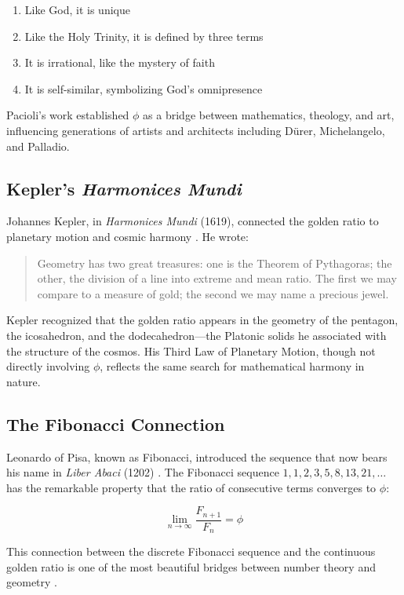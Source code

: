 \begin{enumerate}
    \item Like God, it is unique
    \item Like the Holy Trinity, it is defined by three terms
    \item It is irrational, like the mystery of faith
    \item It is self-similar, symbolizing God's omnipresence
\end{enumerate}

Pacioli's work established $\phi$ as a bridge between mathematics, theology, and art, influencing generations of artists and architects including Dürer, Michelangelo, and Palladio.

\subsection{Kepler's \emph{Harmonices Mundi}}

Johannes Kepler, in \emph{Harmonices Mundi} (1619), connected the golden ratio to planetary motion and cosmic harmony \cite{kepler_harmonices}. He wrote:

\begin{quote}
Geometry has two great treasures: one is the Theorem of Pythagoras; the other, the division of a line into extreme and mean ratio. The first we may compare to a measure of gold; the second we may name a precious jewel.
\end{quote}

Kepler recognized that the golden ratio appears in the geometry of the pentagon, the icosahedron, and the dodecahedron—the Platonic solids he associated with the structure of the cosmos. His Third Law of Planetary Motion, though not directly involving $\phi$, reflects the same search for mathematical harmony in nature.

\subsection{The Fibonacci Connection}

Leonardo of Pisa, known as Fibonacci, introduced the sequence that now bears his name in \emph{Liber Abaci} (1202) \cite{fibonacci_liber_abaci}. The Fibonacci sequence $1, 1, 2, 3, 5, 8, 13, 21, \dots$ has the remarkable property that the ratio of consecutive terms converges to $\phi$:

\[
\lim_{n \to \infty} \frac{F_{n+1}}{F_n} = \phi
\]

This connection between the discrete Fibonacci sequence and the continuous golden ratio is one of the most beautiful bridges between number theory and geometry \cite{hardy_wright}.

